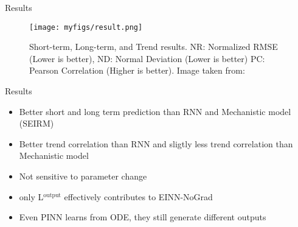 \documentclass[
	aspectratio=169,	%
	onlytextwidth,		%
	t,					%
	]{beamer}
\begin{document}
\begin{frame}[fragile]{Results}

	\begin{figure}
		\texttt{[image: myfigs/result.png]}
		\caption{Short-term, Long-term, and Trend results. NR: Normalized RMSE (Lower is better), ND: Normal Deviation (Lower is better) PC: Pearson Correlation (Higher is better). Image taken from:~\cite{main}}
	\end{figure}

\end{frame}

\begin{frame}[fragile]{Results}

\begin{itemize}
	\item<1-> Better short and long term prediction than RNN and Mechanistic model (SEIRM)
	\item<2-> Better trend correlation than RNN and sligtly less trend correlation than Mechanistic model
	\item <3-> Not sensitive to parameter change~\cite{main}
	\item <4-> only L$^{\text{output}}$ effectively contributes to EINN-NoGrad~\cite{main}
	\item <5-> Even PINN learns from ODE, they still generate different outputs~\cite{main}
\end{itemize}
\end{frame}


\appendix

\makebibliography

\makethankyou
\end{document}

